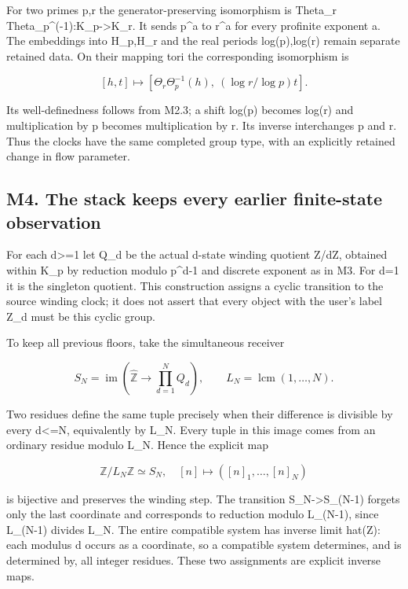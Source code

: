 For two primes p,r the generator-preserving isomorphism is Theta\_r
Theta\_p\^{}(-1):K\_p-\textgreater K\_r. It sends p\^{}a to r\^{}a for
every profinite exponent a. The embeddings into H\_p,H\_r and the real
periods log(p),log(r) remain separate retained data. On their mapping
tori the corresponding isomorphism is

\[
[h,t]\longmapsto
[\Theta_r\Theta_p^{-1}(h),\ (\log r/\log p)t].
\tag{M3.4}
\]

Its well-definedness follows from M2.3; a shift log(p) becomes log(r)
and multiplication by p becomes multiplication by r. Its inverse
interchanges p and r. Thus the clocks have the same completed group
type, with an explicitly retained change in flow parameter.

\subsection{M4. The stack keeps every earlier finite-state
observation}\label{m4.-the-stack-keeps-every-earlier-finite-state-observation}

For each d\textgreater=1 let Q\_d be the actual d-state winding quotient
Z/dZ, obtained within K\_p by reduction modulo p\^{}d-1 and discrete
exponent as in M3. For d=1 it is the singleton quotient. This
construction assigns a cyclic transition to the source winding clock; it
does not assert that every object with the user's label Z\_d must be
this cyclic group.

To keep all previous floors, take the simultaneous receiver

\[
S_N=\operatorname{im}\left(\widehat{\mathbb Z}
\longrightarrow\prod_{d=1}^N Q_d\right),\qquad
L_N=\operatorname{lcm}(1,\ldots,N).
\tag{M4.1}
\]

Two residues define the same tuple precisely when their difference is
divisible by every d\textless=N, equivalently by L\_N. Every tuple in
this image comes from an ordinary residue modulo L\_N. Hence the
explicit map

\[
\mathbb Z/L_N\mathbb Z\simeq S_N,\quad
[n]\longmapsto([n]_1,\ldots,[n]_N)
\tag{M4.2}
\]

is bijective and preserves the winding step. The transition
S\_N-\textgreater S\_(N-1) forgets only the last coordinate and
corresponds to reduction modulo L\_(N-1), since L\_(N-1) divides L\_N.
The entire compatible system has inverse limit hat(Z): each modulus d
occurs as a coordinate, so a compatible system determines, and is
determined by, all integer residues. These two assignments are explicit
inverse maps.

